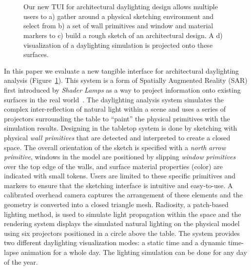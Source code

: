 \documentclass[review]{vgtc}                 %
\begin{document}
\begin{figure}[t]
\begin{minipage}{1.65in}~{\color{white}{\bf d)}}\end{minipage}\vspace{-0.00in}\\
  \caption{Our new TUI for architectural daylighting design allows
    multiple users to a) gather around a physical sketching
    environment and select from b) a set of wall primitives and window
    and material markers to c) build a rough sketch of an
    architectural design.  A d) visualization of a daylighting
    simulation is projected onto these surfaces. }
\vspace{-0.1in}
  \label{figure:tabletop}
\end{figure}




In this paper we evaluate a new tangible interface for architectural
daylighting analysis (Figure~\ref{figure:tabletop}).  This system is a
form of Spatially Augmented Reality (SAR) first introduced by
\emph{Shader Lamps} as a way to project information onto existing
surfaces in the real world~\cite{Raskar:2001:SLA}.  The daylighting
analysis system simulates the complex inter-reflection of natural
light within a scene and uses a series of projectors surrounding the
table to ``paint'' the physical primitives with the simulation
results.  Designing in the tabletop system is done by sketching with
physical \emph{wall primitives} that are detected and interpreted to
create a closed space.  The overall orientation of the sketch is
specified with a \emph{north arrow primitive}, windows in the model
are positioned by slipping \emph{window primitives} over the top edge
of the walls, and surface material properties (color) are indicated
with small tokens.  Users are limited to these specific primitives and
markers to ensure that the sketching interface is intuitive and
easy-to-use.
%
A calibrated overhead camera captures the arrangement of these
elements and 
the geometry is converted into a closed triangle mesh.  Radiosity, a
patch-based lighting method, is used to simulate light propagation
within the space and the rendering system displays the simulated
natural lighting on the physical model using six projectors positioned
in a circle above the table.  The system provides two different
daylighting visualization modes: a static time and a dynamic
time-lapse animation for a whole day.  The lighting simulation can be
done for any day of the year.
\end{document}

